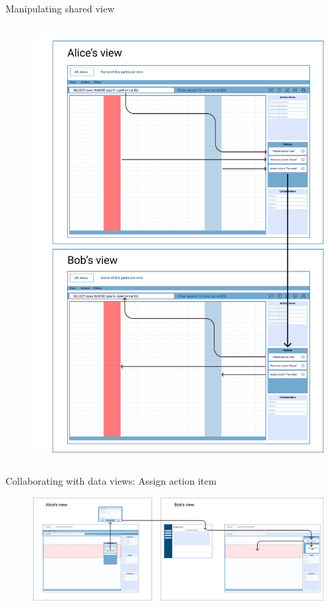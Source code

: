 \documentclass[aspectratio=169]{beamer}
\begin{document}
\begin{frame}{Manipulating shared view}
\begin{columns}
\begin{column}{0.45\textwidth}
\begin{figure}[h]
                \includegraphics[width=1\textwidth]{images/sharing-history.png}
            \end{figure}
        \end{column}
    \end{columns}
\end{frame}

\begin{frame}{Collaborating with data views: Assign action item}
    \begin{figure}[h]
        \centering
        \includegraphics[width=1\textwidth]{images/assign-action-item.png}
    \end{figure}
\end{frame}
\end{document}

